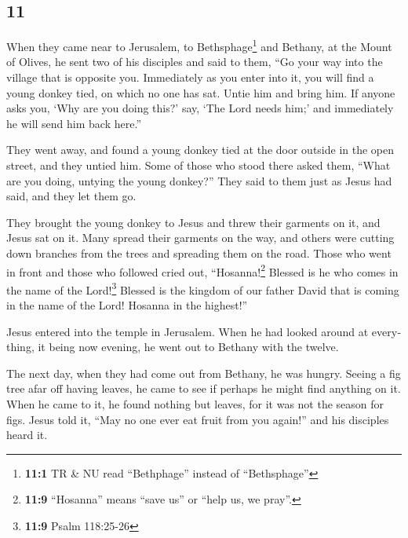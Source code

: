 \begin{paracol}{2}
\switchcolumn
\begin{otherlanguage}{english}

\hypertarget{section-21}{%
\section{11}\label{section-21}}

 When they came near to Jerusalem, to
Bethsphage\footnote{\textbf{11:1} TR \& NU read ``Bethphage'' instead of
  ``Bethsphage''} and Bethany, at the Mount of Olives, he sent two of
his disciples  and said to them, ``Go your way into the
village that is opposite you. Immediately as you enter into it, you will
find a young donkey tied, on which no one has sat. Untie him and bring
him.  If anyone asks you, `Why are you doing this?' say,
`The Lord needs him;' and immediately he will send him back here.''

 They went away, and found a young donkey tied at the door
outside in the open street, and they untied him.  Some of
those who stood there asked them, ``What are you doing, untying the
young donkey?''  They said to them just as Jesus had said,
and they let them go.

 They brought the young donkey to Jesus and threw their
garments on it, and Jesus sat on it.  Many spread their
garments on the way, and others were cutting down branches from the
trees and spreading them on the road.  Those who went in
front and those who followed cried out, ``Hosanna!\footnote{\textbf{11:9}
  ``Hosanna'' means ``save us'' or ``help us, we pray''.} Blessed is he
who comes in the name of the Lord!\footnote{\textbf{11:9} Psalm
  118:25-26}  Blessed is the kingdom of our father David
that is coming in the name of the Lord! Hosanna in the highest!''

 Jesus entered into the temple in Jerusalem. When he had
looked around at everything, it being now evening, he went out to
Bethany with the twelve.

 The next day, when they had come out from Bethany, he
was hungry.  Seeing a fig tree afar off having leaves, he
came to see if perhaps he might find anything on it. When he came to it,
he found nothing but leaves, for it was not the season for figs.
 Jesus told it, ``May no one ever eat fruit from you
again!'' and his disciples heard it.


\end{otherlanguage}
\end{paracol}
